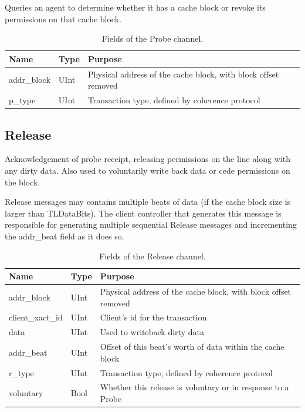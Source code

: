 Queries an agent to determine whether it has a cache block or revoke its permissions on that cache block.

\begin{table}[ht]
\begin{center}
\begin{tabular}{|l|l|l|}
    \hline
    Name & Type & Purpose \\ \hline \hline
addr\_block & UInt & Physical address of the cache block, with block offset removed \\ \hline
p\_type & UInt & Transaction type, defined by coherence protocol \\ \hline
\end{tabular}
\end{center}
\caption{Fields of the Probe channel.}
\label{tab:probe}
\end{table}


\subsection{Release}

Acknowledgement of probe receipt, releasing permissions on the line along with any dirty data.
Also used to voluntarily write back data or cede permissions on the block.

Release messages may contains multiple beats of data (if the cache block size is larger than TLDataBits).
The client controller that generates this message is responsible for generating multiple sequential Release messages and incrementing the addr\_beat field as it does so.

\begin{table}[ht]
\begin{center}
\begin{tabular}{|l|l|l|}
    \hline
    Name & Type & Purpose \\ \hline \hline
addr\_block & UInt & Physical address of the cache block, with block offset removed \\ \hline
client\_xact\_id & UInt & Client's id for the transaction \\ \hline
data & UInt & Used to writeback dirty data \\ \hline
addr\_beat & UInt & Offset of this beat's worth of data within the cache block \\ \hline
r\_type & UInt & Transaction type, defined by coherence protocol \\ \hline
voluntary & Bool & Whether this release is voluntary or in response to a Probe \\ \hline
\end{tabular}
\end{center}
\caption{Fields of the Release channel.}
\label{tab:release}
\end{table}

